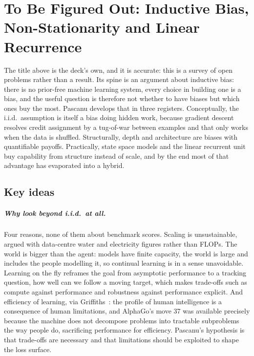 \chapter[To Be Figured Out]{To Be Figured Out: Inductive Bias, Non-Stationarity
  and Linear Recurrence}
\label{ch:07-to-be-figured-out}


The title above is the deck's own, and it is accurate: this is a survey of open problems rather
than a result. Its spine is an argument about inductive bias: there is no prior-free machine learning system, every choice
in building one is a bias, and the useful question is therefore not whether to have biases but
which ones buy the most. Pascanu develops that in three registers. Conceptually, the i.i.d.\
assumption is itself a bias doing hidden work, because gradient descent resolves credit assignment
by a tug-of-war between examples and that only works when the data is shuffled. Structurally,
depth and architecture are biases with quantifiable payoffs. Practically, state space models and the
linear recurrent unit buy capability from structure instead of scale, and by the end most of that advantage has evaporated into a hybrid.

\section*{Key ideas}

\paragraph{Why look beyond i.i.d.\ at all.} Four reasons, none of them about benchmark scores.
Scaling is unsustainable, argued with data-centre water and electricity figures rather than
FLOPs. The world is bigger than the agent: models have finite capacity, the world is large and
includes the people modelling it, so continual learning is in a sense unavoidable. Learning on
the fly reframes the goal from asymptotic performance to a tracking question, how well can we
follow a moving target, which makes trade-offs such as compute against performance and
robustness against performance explicit. And efficiency of learning, via
Griffiths~\citep{griffiths2020}: the profile of human intelligence is a consequence of human
limitations, and AlphaGo's move 37 was available precisely because the machine does not
decompose problems into tractable subproblems the way people do, sacrificing performance for
efficiency. Pascanu's hypothesis is that trade-offs are necessary and that limitations should
be exploited to shape the loss surface.

